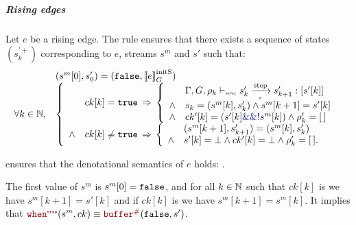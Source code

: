 \begin{skippableproof}
    \subparagraph{Rising edges}
    Let $e$ be a rising edge. The rule 
    ensures that there exists a sequence of states $(s_k^{\prime+})$ corresponding to $e$, streams
    $s^m$ and $s'$ such that:
    \begin{equation*}
        \begin{array}{ll}
                              & (s^m[0], s'_0) = (\false, \initstate{e}) \\
            \forall k \in \N, &
            \left\{
            \begin{array}{ll}
                       & ck[k] = \true \, \Rightarrow \,
                \left\{
                \begin{array}{ll}
                           & \exprOpsem{\rho_k}{s'_k}{e}{s'_{k+1}}{s'[k]}                          \\
                    \wedge & s_k = (s^m[k], s'_k) \wedge s^m[k+1] = s'[k]                          \\
                    \wedge & ck'[k] = (s'[k] \kwf{\&\&} \kwf{!} s^m[k]) \wedge \rho'_k = \emptyrho \\
                \end{array}
                \right.                                     \\
                \wedge & ck[k] \neq \true \, \Rightarrow \,
                \left\{
                \begin{array}{ll}
                           & (s^m[k+1], s'_{k+1}) = (s^m[k], s'_{k})                       \\
                    \wedge & s'[k] = \bot \wedge ck'[k] = \bot \wedge \rho'_k = \emptyrho. \\
                \end{array}
                \right.                                     \\
            \end{array}
            \right.
        \end{array}
    \end{equation*}

     ensures that the denotational semantics of $e$ holds:
    .

    The first value of $s^m$ is $s^m[0] = \mathtt{{false}}$, and for all $k \in \mathbb{N}$ such that
    $ck[k]$ is \true we have $s^m[k+1] = s'[k]$ and if $ck[k]$ is \false we have $s^m[k+1]
        = s^m[k]$. It implies that $\whenT{s^m}{ck} \equiv \buffer{\false}{s'}$.


\end{skippableproof}
